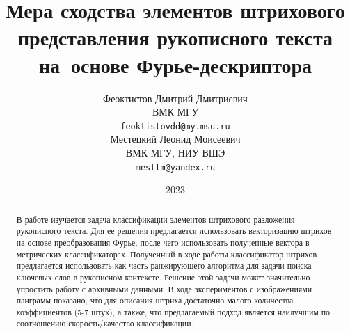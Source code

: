 \documentclass{article}
\title{Мера сходства элементов штрихового представления рукописного текста на~основе Фурье-дескриптора}
\author{ Феоктистов Дмитрий Дмитриевич \\
	ВМК МГУ\\
	\texttt{feoktistovdd@my.msu.ru} \\
	\And
	Местецкий Леонид Моисеевич \\
	ВМК МГУ, НИУ ВШЭ\\
	\texttt{mestlm@yandex.ru} \\
}
\date{2023}
\begin{document}
\maketitle
\begin{abstract}
В работе изучается задача классификации элементов штрихового разложения рукописного текста. Для ее решения предлагается использовать векторизацию штрихов на основе преобразования Фурье, после чего использовать полученные вектора в метрических классификаторах. Полученный в ходе работы классификатор штрихов предлагается использовать как часть ранжирующего алгоритма для задачи поиска ключевых слов в рукописном контексте. Решение этой задачи может значительно упростить работу с архивными данными. В ходе экспериментов с изображениями панграмм показано, что для описания штриха достаточно малого количества коэффициентов (5-7 штук), а также, что предлагаемый подход является наилучшим по соотношению скорость/качество классификации. 
\end{abstract}


\end{document}
